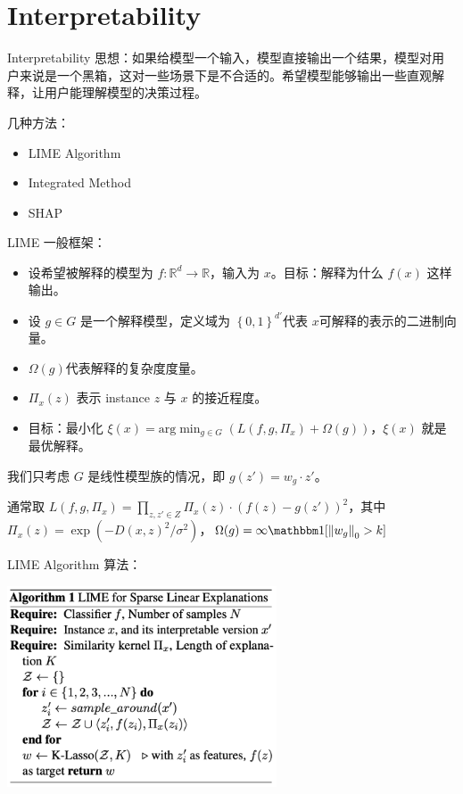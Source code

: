 \section{Interpretability}

\begin{frame}{Interpretability}
    思想：如果给模型一个输入，模型直接输出一个结果，模型对用户来说是一个黑箱，这对一些场景下是不合适的。希望模型能够输出一些直观解释，让用户能理解模型的决策过程。

    几种方法：
    \begin{itemize}
        \item LIME Algorithm
        \item Integrated Method
        \item SHAP
    \end{itemize}
\end{frame}

\begin{frame}{LIME}
    一般框架：
    \begin{itemize}
        \item 设希望被解释的模型为 $f: \mathbb{R}^{d}\to \mathbb{R}$，输入为 $x$。目标：解释为什么 $f(x)$ 这样输出。
        \item 设 $g \in G$ 是一个解释模型，定义域为 $\left\{ 0, 1 \right\}^{d'} $代表 $x$可解释的表示的二进制向量。
        \item $\Omega(g)$代表解释的复杂度度量。
        \item $\Pi_x(z)$ 表示 instance $z$ 与 $x$ 的接近程度。
        \item 目标：最小化 $\xi(x) = \text{arg}\min_{g \in G}\left( L(f, g, \Pi_x) + \Omega(g) \right) $，$\xi(x)$ 就是最优解释。
    \end{itemize}
    我们只考虑 $G$ 是线性模型族的情况，即 $g(z') = w_g \cdot z'$。
    
    通常取 $L(f, g, \Pi_x) = \prod_{z, z' \in Z} \Pi_x (z) \cdot (f(z) - g(z'))^{2}$，其中$\Pi_x(z) = \exp\left( - D(x, z)^{2} / \sigma^{2} \right) $，$\Omega(g) = \infty \mathbbm 1[\left\| w_g \right\| _0 > k]$

\end{frame}

\begin{frame}{LIME Algorithm}
    算法：
    \begin{center}
        \includegraphics[width=0.6\textwidth]{assets/lime.png}
    \end{center}
\end{frame}

